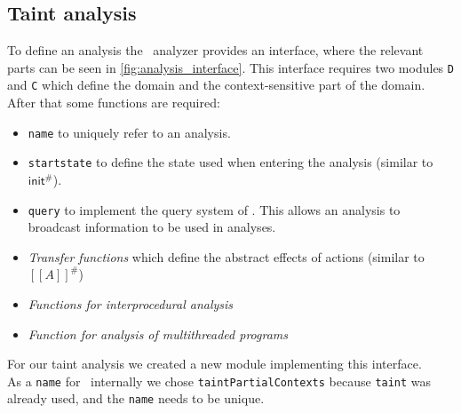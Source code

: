     \subsection{Taint analysis}\label{section:implTaint}
    To define an analysis the \gob\ analyzer provides an interface, where the relevant parts can be seen in \autoref{fig:analysis_interface}. This interface requires two modules \texttt{D} and \texttt{C} which define the domain and the context-sensitive part of the domain. After that some functions are required: 
    \begin{itemize}
      \item \texttt{name} to uniquely refer to an analysis.
      \item \texttt{startstate} to define the state used when entering the analysis (similar to $\textsf{init}^{\#}$).
      \item \texttt{query} to implement the query system of \gob. This allows an analysis to broadcast information to be used in analyses.
      \item \textit{Transfer functions} which define the abstract effects of actions (similar to $[\![A]\!]^{\#}$)
      \item \textit{Functions for interprocedural analysis}
      \item \textit{Function for analysis of multithreaded programs}
    \end{itemize}

    For our taint analysis we created a new module implementing this interface.\\
    As a \texttt{name} for \gob\ internally we chose \texttt{taintPartialContexts} because \texttt{taint} was already used, and the \texttt{name} needs to be unique.

